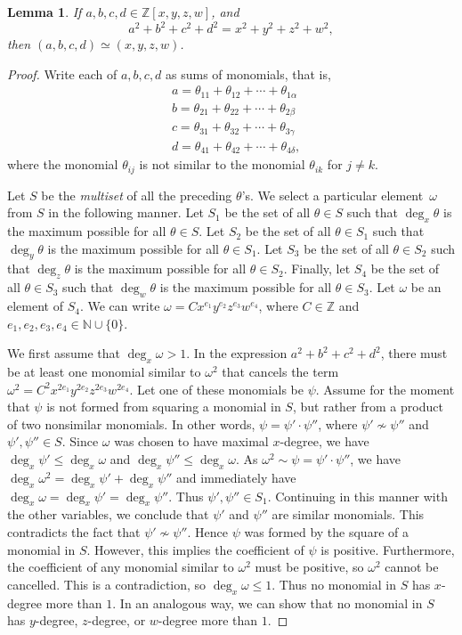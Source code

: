 \documentclass[12pt,table]{article}
\newtheorem{lemma}[theorem]{Lemma}
\theoremstyle{definition}
\theoremstyle{remark}
\newcommand{\Nnn}{\mathbb N}
\newcommand{\Zzz}{\mathbb Z}
\numberwithin{equation}{section}
\begin{document}
\begin{lemma}
If $a, b, c, d \in \Zzz[x,y,z,w]$, and
\[
a^2 + b^2 + c^2 + d^2 = x^2 + y^2 + z^2 + w^2,
\]
then $ (a, b, c, d ) \simeq (x, y, z, w )$.
\end{lemma}
\begin{proof}
Write each of $ a,b,c,d $ as sums of monomials, that is, 
\begin{align*}
&a = \theta_{11} + \theta_{12} + \cdots + \theta_{1\alpha}
\\
&b = \theta_{21} + \theta_{22} + \cdots + \theta_{2\beta}
\\
&c = \theta_{31} + \theta_{32} + \cdots + \theta_{3\gamma}
\\
&d = \theta_{41} + \theta_{42} + \cdots + \theta_{4\delta},
\end{align*}
where the monomial $ \theta_{ij}$ is not similar
to the monomial $\theta_{ik}$ for $ j \neq k$.

Let $S$ be the \emph{multiset} of all the preceding $ \theta $'s.
We select a particular element~$ \omega $
from $S$ in the following manner.
Let $ S_1 $ be the set of all $ \theta \in S  $ such that
$ \deg_x \theta $ is the maximum possible for all $ \theta \in S $.
Let $ S_2 $ be the set of all $ \theta \in S_1  $ such that
$ \deg_y \theta $ is the maximum possible for all $ \theta \in S_1 $.
Let $ S_3 $ be the set of all $ \theta \in S_2  $ such that
$ \deg_z \theta $ is the maximum possible for all $ \theta \in S_2 $.
Finally, let $ S_4 $ be the set of all $ \theta \in S_3  $ such that
$ \deg_w \theta $ is the maximum possible for all $ \theta \in S_3 $.
Let $ \omega $ be an element of $ S_4 $. 
We can write $ \omega = Cx^{e_1}y^{e_2}z^{e_3}w^{e_4}$, where $ C \in \Zzz $
and $ e_1,e_2,e_3,e_4 \in \Nnn \cup \{0\} $.

We first assume that $\deg_x \omega > 1 $.
In the expression  
$a^2 + b^2 + c^2 + d^2$, there must be at least one monomial similar to $ \omega^2 $
that cancels the term $ \omega^2 = C^2x^{2e_1}y^{2e_2}z^{2e_3}w^{2e_4}$.
Let one of these monomials be $ \psi $. Assume for the moment that $ \psi $
is not formed from squaring a monomial in $S$, but rather
from a product of two nonsimilar monomials.
In other words, $ \psi = \psi' \cdot \psi''$, where $ \psi' \nsim \psi'' $
and $ \psi' , \psi'' \in S $. Since $\omega$ was chosen to have maximal $x$-degree,
we have $\deg_x \psi' \leq \deg_x \omega$ and
$\deg_x \psi'' \leq \deg_x \omega$.
As $\omega^2 \sim \psi = \psi' \cdot \psi''$,
we have $ \deg_x \omega^2 = \deg_x \psi' + \deg_x \psi''$
and immediately have $ \deg_x \omega = \deg_x \psi' = \deg_x \psi'' $.
Thus $ \psi' , \psi'' \in S_1 $. Continuing in this manner
with the other variables, we
conclude that $ \psi' $ and $ \psi'' $ are similar monomials.
This contradicts the fact that $ \psi' \nsim \psi'' $.
Hence $ \psi $ was
formed by the square of a monomial in $ S $. However, this implies the coefficient
of $ \psi $ is positive. Furthermore, the coefficient of
any monomial similar to $ \omega^2 $ must be positive,
so $ \omega^2 $ cannot be cancelled. This is
a contradiction, so $ \deg_x \omega \leq 1 $. Thus no monomial in $S$ has $x$-degree more
than $1$. In an analogous way, we can show that no monomial in $S$ has $y$-degree, $z$-degree,
or $w$-degree more than $1$.


\end{proof}
\end{document}

